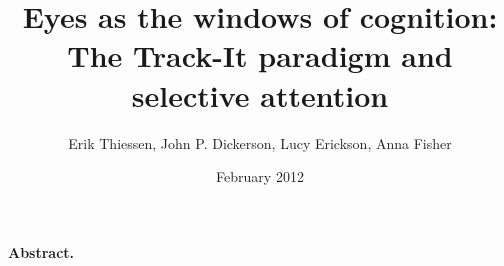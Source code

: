 

\title{Eyes as the windows of cognition: The Track-It paradigm and selective attention}
\author{Erik Thiessen, John P. Dickerson, Lucy Erickson, Anna Fisher}
\date{February 2012}
\maketitle

\noindent\textbf{Abstract.}



